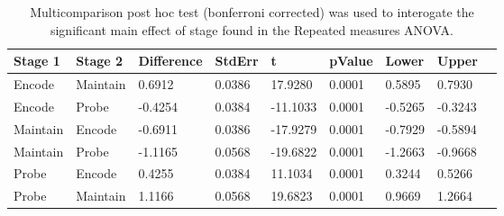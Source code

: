 \begin{table}
\centering
\begin{tabular}[0.2em]{@{}lllllllll@{}}\toprule
Stage 1 & Stage 2 & Difference & StdErr & t & pValue & Lower & Upper\\\toprule[0.2em]
Encode & Maintain & 0.6912 & 0.0386 & 17.9280 & 0.0001 & 0.5895 & 0.7930 \\\midrule
Encode & Probe & -0.4254 & 0.0384 & -11.1033 & 0.0001 & -0.5265 & -0.3243 \\\midrule
Maintain & Encode & -0.6911 & 0.0386 & -17.9279 & 0.0001 & -0.7929 & -0.5894 \\\midrule
Maintain & Probe & -1.1165 & 0.0568 & -19.6822 & 0.0001 & -1.2663 & -0.9668 \\\midrule
Probe & Encode & 0.4255 & 0.0384 & 11.1034 & 0.0001 & 0.3244 & 0.5266 \\\midrule
Probe & Maintain & 1.1166 & 0.0568 & 19.6823 & 0.0001 & 0.9669 & 1.2664 \\\bottomrule[0.2em]
\end{tabular}
\caption{Multicomparison post hoc test (bonferroni corrected) was used to interogate the significant main effect of stage found in the Repeated measures ANOVA.\label{tabel:tbl_RMABA1_PH_Stage}}
\end{table}
